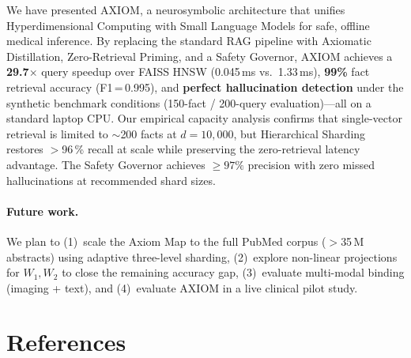 \documentclass[11pt,a4paper]{article}
\begin{document}
We have presented AXIOM, a neurosymbolic architecture that unifies
Hyperdimensional Computing with Small Language Models for safe, offline
medical inference.  By replacing the standard RAG pipeline with Axiomatic
Distillation, Zero-Retrieval Priming, and a Safety Governor, AXIOM
achieves a \textbf{29.7$\times$} query speedup over FAISS HNSW
(0.045\,ms vs.\ 1.33\,ms), \textbf{99\%} fact retrieval accuracy
(F1\,=\,0.995), and \textbf{perfect hallucination detection} under the
synthetic benchmark conditions (150-fact / 200-query evaluation)---all
on a standard laptop CPU.
Our empirical capacity analysis confirms that single-vector retrieval is
limited to $\sim$200 facts at $d = 10{,}000$, but Hierarchical Sharding
restores $>$96\,\% recall at scale while preserving the zero-retrieval
latency advantage.  The Safety Governor achieves $\geq 97\%$ precision
with zero missed hallucinations at recommended shard sizes.

\paragraph{Future work.}
We plan to (1)~scale the Axiom Map to the full PubMed corpus ($>$35\,M
abstracts) using adaptive three-level sharding, (2)~explore non-linear
projections for $W_1, W_2$ to close the remaining accuracy gap,
(3)~evaluate multi-modal binding (imaging + text), and (4)~evaluate
AXIOM in a live clinical pilot study.

\section*{References}
\end{document}
